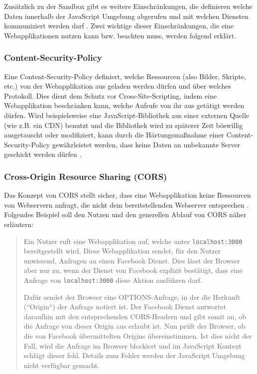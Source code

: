 Zusätzlich zu der Sandbox gibt es weitere Einschränkungen, die definieren welche Daten innerhalb der JavaScript Umgebung abgerufen und mit welchen Diensten kommuniziert werden darf \cite{LearningJavaScript}. Zwei wichtige dieser Einschränkungen, die eine Webapplikationen nutzen kann bzw. beachten muss, werden folgend erklärt.

\subsubsection{Content-Security-Policy}


Eine Content-Security-Policy definiert, welche Ressourcen (also Bilder, Skripte, etc.) von der Webapplikation aus geladen werden dürfen und über welches Protokoll. Dies dient dem Schutz vor Cross-Site-Scripting, indem eine Webapplikation beschränken kann, welche Aufrufe von ihr aus getätigt werden dürfen. Wird beispielsweise eine JavaScript-Bibliothek aus einer externen Quelle (wie z.B. ein CDN) benutzt und die Bibliothek wird zu späterer Zeit böswillig ausgetauscht oder modifiziert, kann durch die Härtungsmaßnahme einer Content-Security-Policy gewährleistet werden, dass keine Daten an unbekannte Server geschickt werden dürfen \cite{MDNContentSecurityPolicy}.

\subsubsection{Cross-Origin Resource Sharing (CORS)}

Das Konzept von CORS stellt sicher, dass eine Webapplikation keine Ressourcen von Webservern anfragt, die nicht dem bereitstellenden Webserver entsprechen \cite{MDNCORS}. Folgendes Beispiel soll den Nutzen und den generellen Ablauf von CORS näher erläutern:

\begin{quotation}
Ein Nutzer ruft eine Webapplikation auf, welche unter \texttt{localhost:3000} bereitgestellt wird. Diese Webapplikation sendet, für den Nutzer unwissend, Anfragen an einen Facebook Dienst. Dies lässt der Browser aber nur zu, wenn der Dienst von Facebook explizit bestätigt, dass eine Anfrage von \texttt{localhost:3000} diese Aktion ausführen darf.

Dafür sendet der Browser eine OPTIONS-Anfrage, in der die Herkunft (``Origin``) der Anfrage notiert ist. Der Facebook Dienst antwortet daraufhin mit den entsprechenden CORS-Headern und gibt somit an, ob die Anfrage von dieser Origin aus erlaubt ist. Nun prüft der Browser, ob die von Facebook übermittelten Origins übereinstimmen. Ist dies nicht der Fall, wird die Anfrage im Browser blockiert und im JavaScript Kontext schlägt dieser fehl. Details zum Fehler werden der JavaScript Umgebung nicht verfügbar gemacht.
\end{quotation}

